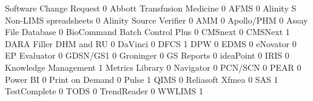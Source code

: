 \documentclass{article}
\begin{document}
\begin{Schunk}
\begin{Soutput}
                                  Software Change Request
                                                        0
  Abbott Transfusion Medicine                           0
  AFMS                                                  0
  Alinity S Non-LIMS spreadsheets                       0
  Alinity Source Verifier                               0
  AMM                                                   0
  Apollo/PHM                                            0
  Assay File Database                                   0
  BioCommand Batch Control Plus                         0
  CMSnext                                               0
  CMSNext                                               1
  DARA Filler DHM and RU                                0
  DaVinci                                               0
  DFCS                                                  1
  DPW                                                   0
  EDMS                                                  0
  eNovator                                              0
  EP Evaluator                                          0
  GDSN/GS1                                              0
  Groninger                                             0
  GS Reports                                            0
  ideaPoint                                             0
  IRIS                                                  0
  Knowledge Management                                  1
  Metrics Library                                       0
  Navigator                                             0
  PCN/SCN                                               0
  PEAR                                                  0
  Power BI                                              0
  Print on Demand                                       0
  Pulse                                                 1
  QIMS                                                  0
  Reliasoft Xfmea                                       0
  SAS                                                   1
  TestComplete                                          0
  TODS                                                  0
  TrendReader                                           0
  WWLIMS                                                1
                                 

\end{Soutput}
\end{Schunk}
\end{document}

